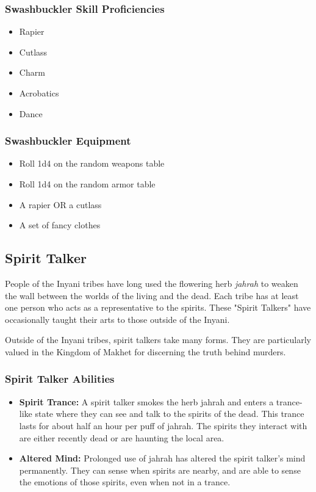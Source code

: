 \begin{multicols}{2}
\subsubsection{Swashbuckler Skill Proficiencies}

\begin{itemize}
  \item Rapier
  \item Cutlass
  \item Charm
  \item Acrobatics
  \item Dance
\end{itemize}

\subsubsection{Swashbuckler Equipment}

\begin{itemize}
  \item Roll 1d4 on the random weapons table
  \item Roll 1d4 on the random armor table
  \item A rapier OR a cutlass
  \item A set of fancy clothes
\end{itemize}

\subsection{Spirit Talker}

People of the Inyani tribes have long used the flowering herb \textit{jahrah} 
to weaken the wall between the worlds of the living and the dead. Each tribe
has at least one person who acts as a representative to the spirits. These
"Spirit Talkers" have occasionally taught their arts to those outside of the
Inyani.

Outside of the Inyani tribes, spirit talkers take many forms. They are
particularly valued in the Kingdom of Makhet for discerning the truth
behind murders.

\subsubsection{Spirit Talker Abilities}

\begin{itemize}
  \item \textbf{Spirit Trance:} A spirit talker smokes the herb jahrah and
    enters a trance-like state where they can see and talk to the spirits of
    the dead. This trance lasts for about half an hour per puff of jahrah. The
    spirits they interact with are either recently dead or are haunting the
    local area.
  \item \textbf{Altered Mind:} Prolonged use of jahrah has altered the spirit
    talker's mind permanently. They can sense when spirits are nearby, and are
    able to sense the emotions of those spirits, even when not in a trance.
\end{itemize}


\end{multicols}
